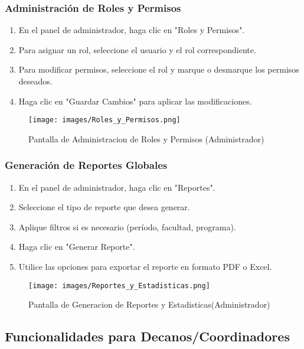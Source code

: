 \documentclass[12pt,a4paper]{article}
\begin{document}
\subsubsection{Administración de Roles y Permisos}
\begin{enumerate}
    \item En el panel de administrador, haga clic en "Roles y Permisos".
    \item Para asignar un rol, seleccione el usuario y el rol correspondiente.
    \item Para modificar permisos, seleccione el rol y marque o desmarque los permisos deseados.
    \item Haga clic en "Guardar Cambios" para aplicar las modificaciones.
\end{enumerate}

\begin{figure}[H]
  \centering
  \texttt{[image: images/Roles\_y\_Permisos.png]}
  \caption{Pantalla de Administracion de Roles y Permisos (Administrador)}
  \label{fig:admin_periodos}
\end{figure}

\subsubsection{Generación de Reportes Globales}
\begin{enumerate}
    \item En el panel de administrador, haga clic en "Reportes".
    \item Seleccione el tipo de reporte que desea generar.
    \item Aplique filtros si es necesario (período, facultad, programa).
    \item Haga clic en "Generar Reporte".
    \item Utilice las opciones para exportar el reporte en formato PDF o Excel.
\end{enumerate}

\begin{figure}[H]
  \centering
  \texttt{[image: images/Reportes\_y\_Estadisticas.png]}
  \caption{Pantalla de Generacion de Reportes y Estadisticas(Administrador)}
  \label{fig:admin_periodos}
\end{figure}

\subsection{Funcionalidades para Decanos/Coordinadores}
\end{document}
